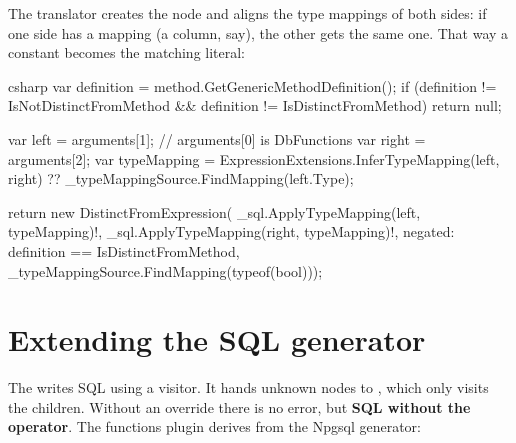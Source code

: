 The translator creates the node and aligns the type mappings of both sides: if one side has
a mapping (a column, say), the other gets the same one. That way a constant becomes the
matching literal:

\begin{sourcecode}{csharp}
var definition = method.GetGenericMethodDefinition();
if (definition != IsNotDistinctFromMethod && definition != IsDistinctFromMethod)
    return null;

var left = arguments[1];                        // arguments[0] is DbFunctions
var right = arguments[2];
var typeMapping = ExpressionExtensions.InferTypeMapping(left, right)
                  ?? _typeMappingSource.FindMapping(left.Type);

return new DistinctFromExpression(
    _sql.ApplyTypeMapping(left, typeMapping)!,
    _sql.ApplyTypeMapping(right, typeMapping)!,
    negated: definition == IsDistinctFromMethod,
    _typeMappingSource.FindMapping(typeof(bool)));
\end{sourcecode}

\section{Extending the SQL generator}

The  writes SQL using a visitor. It hands
unknown nodes to
, which only
visits the children. Without an override there is no error, but \textbf{SQL without the
operator}. The functions plugin derives from the Npgsql generator:

